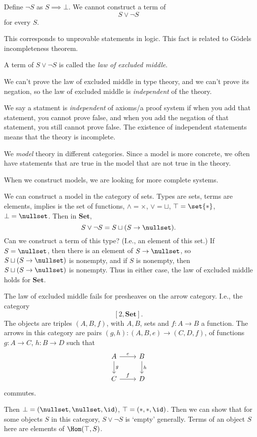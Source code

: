 \documentclass{article}
\theoremstyle{remark}
\begin{document}
\begin{definition}
    Define $\lnot S$ as $S\implies \bot$.
    We cannot construct a term of 
    \[S\vee \lnot S\]
    for every $S$.
\end{definition}

This corresponds to unprovable statements in logic.
This fact is related to G\"odels incompleteness theorem.

A term of $S\vee \lnot S$ is called the 
\emph{law of excluded middle}.

We can't prove the law of excluded middle in type theory, 
and we can't prove its negation, so the law of excluded middle
is \emph{independent} of the theory.

We say a statment is \emph{independent} of axioms/a proof system
if when you add that statement, you cannot prove false, 
and when you add the negation of that statement, you still
cannot prove false.
The existence of independent statements means that the 
theory is incomplete.

We \emph{model} theory in different categories. Since 
a model is more concrete, we often have statements that 
are true in the model that are not true in the theory.

When we construct models, we are looking for more complete
systems.

We can construct a model in the category of sets. Types are 
sets, terms are elements, implies is the set of functions,
$\wedge=\times$, $\vee = \sqcup$, $\top=\set{*}$,
$\bot = \nullset$. Then in $\mathbf{Set}$,
\[S\vee \lnot S = S\sqcup (S\to \nullset).\]
Can we construct a term of this type? (I.e., an element 
of this set.)
If $S=\nullset$, then there is an element of 
$S\to \nullset$, so $S\sqcup (S\to\nullset)$ is nonempty,
and if $S$ is nonempty, then $S\sqcup 
(S\to\nullset)$ is nonempty. Thus in either case, the 
law of excluded middle holds for $\mathbf{Set}$.

The law of excluded middle fails for presheaves on the 
arrow category. I.e., the category
\[[2,\mathbf{Set}].\]
The objects are triples $(A,B,f)$, with $A,B$, sets and 
$f:A\to B$ a function. The arrows in this category
are pairs $(g,h):(A,B,e)\to (C,D,f)$,
of functions $g:A\to C$, $h:B\to D$ such that 
\[
    \begin{tikzcd}
        A\ar[r,"e"]\ar[d,"g"] & B\ar[d,"h"] \\ %
        C\ar[r,"f"] & D 
    \end{tikzcd}
    \]
commutes.

Then $\bot = (\nullset,\nullset,\id)$,
$\top = (*,*,\id)$. Then we can show that for some objects $S$
in this category,
$S\vee \lnot S$ is `empty' generally.
Terms of an object $S$ here are elements of $\Hom(\top,S)$.
\end{document}
